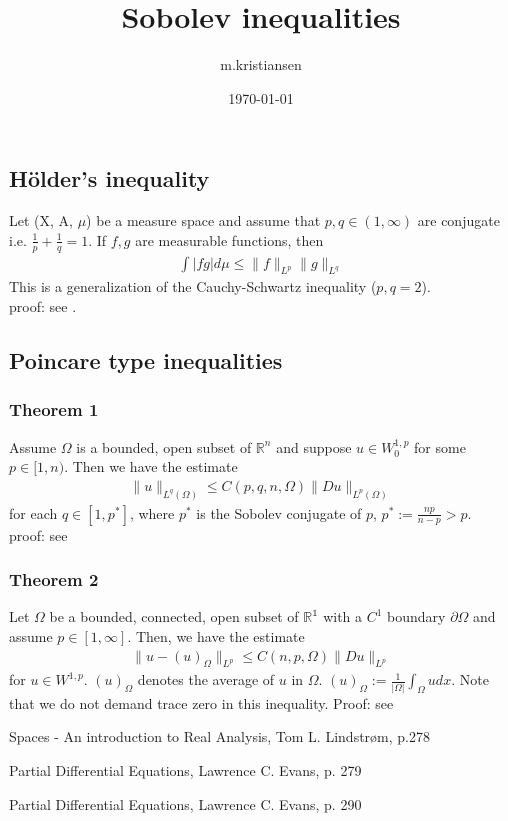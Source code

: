 \documentclass[11pt, norsk, a4paper]{article}
\title{Sobolev inequalities}
\author{m.kristiansen}
\date{\today}
\newcommand\norm[1]{\lVert#1\rVert}
\begin{document}
\maketitle

\subsection*{Hölder's inequality}
Let (X, A, $\mu$) be a measure space and assume that $p,q \in (1, \infty)$ are conjugate i.e. $\frac{1}{p} + \frac{1}{q} = 1$. If $f, g$ are measurable functions, then 
\begin{align*}
    \int |fg| d\mu \leq \norm{f}_{L^p}\norm{g}_{L^q}
\end{align*}
This is a generalization of the Cauchy-Schwartz inequality ($p,q = 2$). \\
proof: see \cite{HIspaces}.

\subsection*{Poincare type inequalities}
\subsubsection*{Theorem 1}
Assume $\Omega$ is a bounded, open subset of $\mathbb{R}^n$ and suppose $u \in W_0^{1,p}$ for some $p\in [1, n)$. Then we have the estimate 
\begin{align*}
    \norm{u}_{L^q(\Omega)} \leq C(p, q, n, \Omega)\norm{Du}_{L^p(\Omega)}
\end{align*}
for each $q \in [1, p^*]$, where $p^*$ is the Sobolev conjugate of $p$, $p^* := \frac{np}{n-p} > p$. \\
proof: see \cite{PIevans}
 
\subsubsection*{Theorem 2}
Let $\Omega$ be a bounded, connected, open subset of $\mathbb{R^1}$ with a $C^1$ boundary $\partial \Omega$ and assume $p \in [1, \infty]$. Then, we have the estimate 
\begin{align*}
    \norm{u-(u)_\Omega}_{L^p} \leq C(n,p, \Omega) \norm{Du}_{L^p}
\end{align*}
for $u \in W^{1,p}$. $(u)_\Omega$ denotes the average of $u$ in $\Omega$. $(u)_\Omega := \frac{1}{|\Omega |} \int_\Omega u dx$. 
Note that we do not demand trace zero in this inequality. 
Proof: see \cite{PI2evans}




\begin{thebibliography}{9}
Spaces - An introduction to Real Analysis, Tom L. Lindstrøm, p.278

Partial Differential Equations, Lawrence C. Evans, p. 279

Partial Differential Equations, Lawrence C. Evans, p. 290

\end{thebibliography}
\end{document}
